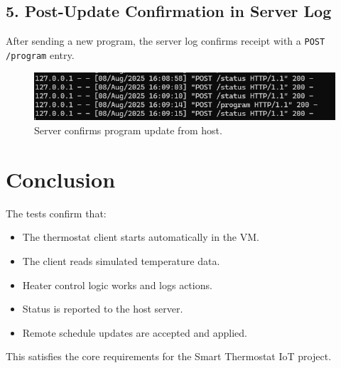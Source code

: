 \documentclass[12pt]{article}
\begin{document}
	\subsection{5. Post-Update Confirmation in Server Log}
	After sending a new program, the server log confirms receipt with a \texttt{POST /program} entry.
	\begin{figure}[h!]
		\centering
		\includegraphics[width=0.85\linewidth]{post-update.png}
		\caption{Server confirms program update from host.}
	\end{figure}
	
	\section{Conclusion}
	The tests confirm that:
	\begin{itemize}
		\item The thermostat client starts automatically in the VM.
		\item The client reads simulated temperature data.
		\item Heater control logic works and logs actions.
		\item Status is reported to the host server.
		\item Remote schedule updates are accepted and applied.
	\end{itemize}
	This satisfies the core requirements for the Smart Thermostat IoT project.
\end{document}
